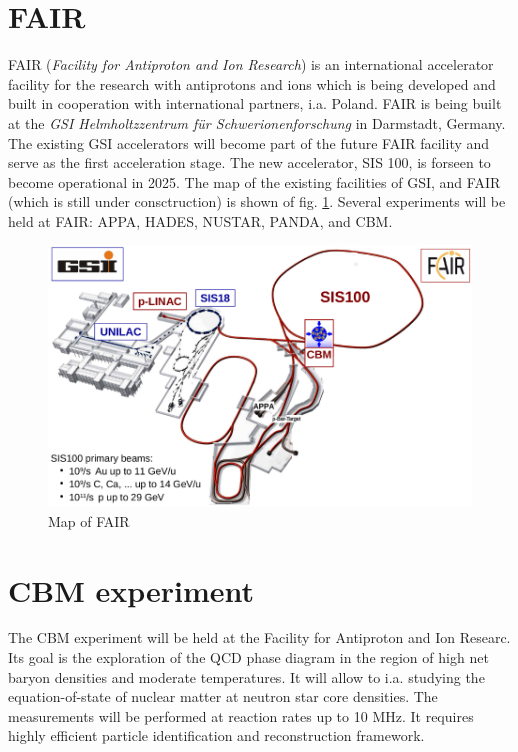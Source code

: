 \pagestyle{fancy}
\section{FAIR}\thispagestyle{fancy}
FAIR (\emph{Facility for Antiproton and Ion Research}) is an international accelerator facility for the research with antiprotons and ions which is being developed and built in cooperation with international partners, i.a. Poland. FAIR is being built at the \emph{GSI Helmholtzzentrum für Schwerionenforschung} in Darmstadt, Germany. The existing GSI accelerators will become part of the future FAIR facility and serve as the first acceleration stage\cite{fair}. The new accelerator, SIS 100, is  forseen to become
operational in 2025\cite{progress report}. The map of the existing facilities of GSI, and FAIR (which is still under consctruction) is shown of fig. \ref{fair map}. Several experiments will be held at FAIR: APPA, HADES, NUSTAR, PANDA, and CBM.
\begin{figure}[H]
    \centering
    \includegraphics[width=.7\textwidth]{img/fair map.png}
    \caption{Map of FAIR\cite{fair}}
    \label{fair map}
\end{figure}
\section{CBM experiment}
The CBM experiment will be held at the Facility for Antiproton and Ion Researc. Its goal is the exploration of the QCD phase diagram in the region of high net baryon densities and moderate temperatures. It will allow to i.a. studying the equation-of-state of nuclear matter at neutron star core densities. The measurements will be performed at reaction rates up to 10 MHz. It requires highly efficient particle identification and reconstruction framework.\cite{cbm-experiment}
